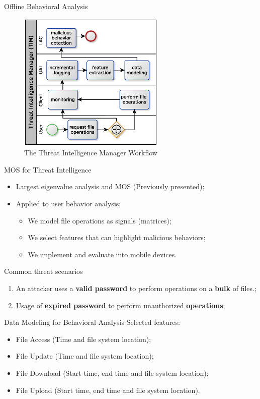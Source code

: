 \documentclass[newPxFont, numfooter, sectionpages]{beamer}
\begin{document}
\begin{frame}[c]{Offline Behavioral Analysis}
	\begin{figure}[h!]
		\centering
		\includegraphics[width=7cm]{figures/ch3/fig06.eps}
		\caption{The Threat Intelligence Manager Workflow}
		\label{fig:3_06}
	\end{figure}
\end{frame}

\begin{frame}[c]{MOS for Threat Intelligence}
	\begin{itemize}
		\item Largest eigenvalue analysis and MOS (Previously presented);
		\item Applied to user behavior analysis;
		\begin{itemize}
			\item We model file operations as signals (matrices);
			\item We select features that can highlight malicious behaviors;
			\item We implement and evaluate into mobile devices.
		\end{itemize}
	\end{itemize}
\end{frame}

\begin{frame}[c]{Common threat scenarios}
	\begin{enumerate}
		\item An attacker uses a \textbf{valid password} to perform operations on a \textbf{bulk} of files.;
		\item Usage of \textbf{expired password} to perform unauthorized \textbf{operations};
	\end{enumerate}
\end{frame}

\begin{frame}[c]{Data Modeling for Behavioral Analysis}
	Selected features:
	\begin{itemize}
		\item File Access (Time and file system location);
		\item File Update (Time and file system location);
		\item File Download (Start time, end time and file system location);
		\item File Upload (Start time, end time and file system location).
	\end{itemize}
\end{frame}
\end{document}
